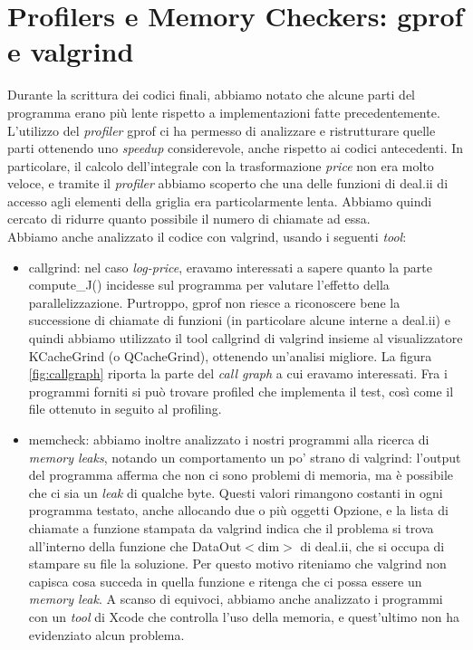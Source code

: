 \documentclass[a4paper,10pt]{report}
\theoremstyle{plain}
\theoremstyle{definition}
\theoremstyle{remark}
\begin{document}
\section{Profilers e Memory Checkers: \textsf{gprof} e \textsf{valgrind}}
Durante la scrittura dei codici finali, abbiamo notato che alcune parti del programma erano più lente rispetto a implementazioni fatte precedentemente. L'utilizzo del \emph{profiler} \textsf{gprof} ci ha permesso di analizzare e ristrutturare quelle parti ottenendo uno \emph{speedup} considerevole, anche rispetto ai codici antecedenti. In particolare, il calcolo dell'integrale con la trasformazione \emph{price} non era molto veloce, e tramite il \emph{profiler} abbiamo scoperto che una delle funzioni di \textsf{deal.ii} di accesso agli elementi della griglia era particolarmente lenta. Abbiamo quindi cercato di ridurre quanto possibile il numero di chiamate ad essa.\\
Abbiamo anche analizzato il codice con \textsf{valgrind}, usando i seguenti \emph{tool}:
\begin{itemize}
 \item \textsf{callgrind}: nel caso \emph{log-price}, eravamo interessati a sapere quanto la parte \textsf{compute\_J()} incidesse sul programma per valutare l'effetto della parallelizzazione. Purtroppo, \textsf{gprof} non riesce a riconoscere bene la successione di chiamate di funzioni (in particolare alcune interne a \textsf{deal.ii}) e quindi abbiamo utilizzato il tool \textsf{callgrind} di \textsf{valgrind} insieme al visualizzatore \textsf{KCacheGrind} (o \textsf{QCacheGrind}), ottenendo un'analisi migliore. La figura \ref{fig:callgraph} riporta la parte del \emph{call graph} a cui eravamo interessati. Fra i programmi forniti si può trovare \textsf{profiled} che implementa il test, cos\`i come il file ottenuto in seguito al profiling.
 \item \textsf{memcheck}: abbiamo inoltre analizzato i nostri programmi alla ricerca di \emph{memory leaks}, notando un comportamento un po' strano di \textsf{valgrind}: l'output del programma afferma che non ci sono problemi di memoria, ma \`e possibile che ci sia un \emph{leak} di qualche byte. Questi valori rimangono costanti in ogni programma testato, anche allocando due o pi\`u oggetti Opzione, e la lista di chiamate a funzione stampata da \textsf{valgrind} indica che il problema si trova all'interno della funzione che \textsf{DataOut$<$dim$>$} di \textsf{deal.ii}, che si occupa di stampare su file la soluzione. Per questo motivo riteniamo che \textsf{valgrind} non capisca cosa succeda in quella funzione e ritenga che ci possa essere un \emph{memory leak}. A scanso di equivoci, abbiamo anche analizzato i programmi con un \emph{tool} di Xcode che controlla l'uso della memoria, e quest'ultimo non ha evidenziato alcun problema.
\end{itemize}
\end{document}

